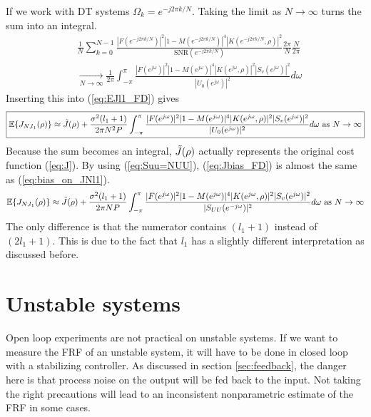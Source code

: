 If we work with DT systems $\Omega_k = e^{-j 2 \pi k /N}$. Taking the limit as $N \rightarrow \infty$ turns the sum into an integral.
\begin{align*}
    &\frac{1}{N}\sum_{k=0}^{N-1} \frac{|F(e^{-j 2 \pi k /N})|^2|1-M(e^{-j 2 \pi k /N})|^4 |K(e^{-j 2 \pi k /N},\rho)|^2}{\text{SNR}(e^{-j 2 \pi k /N})} \frac{2 \pi}{N} \frac{N}{2 \pi}\\
    & \xrightarrow[N \rightarrow \infty]{} \frac{1}{2 \pi} \int_{-\pi}^{\pi} \frac{|F(e^{j\omega})|^2|1-M(e^{j\omega})|^4 |K(e^{j\omega},\rho)|^2 |S_v(e^{j\omega})|^2}{|U_0(e^{j\omega})|^2 } d\omega
\end{align*}
Inserting this into (\ref{eq:EJl1_FD}) gives
\begin{equation}
\boxed{
    \mathbb{E}\{J_{N,l_1}(\rho)\} \approx \Tilde{J}(\rho) +  \frac{\sigma^2 (l_1+1)}{2 \pi N^2 P} \int_{-\pi}^{\pi} \frac{|F(e^{j\omega})|^2|1-M(e^{j\omega})|^4 |K(e^{j\omega},\rho)|^2 |S_v(e^{j\omega})|^2}{|U_0(e^{j\omega})|^2 } d\omega \text{ as } N \rightarrow \infty
    }
    \label{eq:Jbias_FD}
\end{equation}
Because the sum becomes an integral, $\Tilde{J}(\rho)$ actually represents the original cost function (\ref{eq:J}). By using (\ref{eq:Suu=NUU}),
(\ref{eq:Jbias_FD}) is almost the same as (\ref{eq:bias_on_JNl1}).
\begin{equation}
    \mathbb{E}\{J_{N,l_1}(\rho)\} \approx \Tilde{J}(\rho) +  \frac{\sigma^2 (l_1+1)}{2 \pi N P} \int_{-\pi}^{\pi} \frac{|F(e^{j\omega})|^2|1-M(e^{j\omega})|^4 |K(e^{j\omega},\rho)|^2 |S_v(e^{j\omega})|^2}{|S_{UU}({e^{-j\omega}})|^2 } d\omega \text{ as } N \rightarrow \infty
\end{equation}
The only difference is that the numerator contains $(l_1+1)$ instead of $(2l_1+1)$. This is due to the fact that $l_1$ has a slightly different interpretation as discussed before.

\newpage
\section{Unstable systems}
\label{sec:unstable}
Open loop experiments are not practical on unstable systems. If we want to measure the FRF of an unstable system, it will have to be done in closed loop with a stabilizing controller. As discussed in section \ref{sec:feedback}, the danger here is that process noise on the output will be fed back to the input. Not taking the right precautions will lead to an inconsistent nonparametric estimate of the FRF in some cases.

